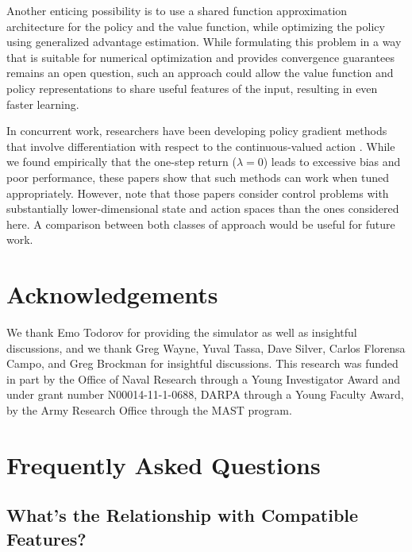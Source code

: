 \documentclass{article}
\begin{document}
Another enticing possibility is to use a shared function approximation architecture for the policy and the value function, while optimizing the policy using generalized advantage estimation.
While formulating this problem in a way that is suitable for numerical optimization and provides convergence guarantees remains an open question, such an approach could allow the value function and policy representations to share useful features of the input, resulting in even faster learning.

In concurrent work, researchers have been developing policy gradient methods that involve differentiation with respect to the continuous-valued action \citep{lillicrap2015continuous,heess2015learning}.
While we found empirically that the one-step return ($\lambda=0$) leads to excessive bias and poor performance, these papers show that such methods can work when tuned appropriately.
However, note that those papers consider control problems with substantially lower-dimensional state and action spaces than the ones considered here.
A comparison between both classes of approach would be useful for future work.





\section*{Acknowledgements}
We thank Emo Todorov for providing the simulator as well as insightful discussions, and we thank Greg Wayne, Yuval Tassa, Dave Silver, Carlos Florensa Campo, and Greg Brockman for insightful discussions.
This research was funded in part by the Office of Naval Research through a Young Investigator Award and under grant number N00014-11-1-0688,
DARPA through a Young Faculty Award, by the Army Research Office through the MAST program.

\appendix

\section{Frequently Asked Questions}

\newcommand{\gradthi}{\grad_{\theta_i}}
\newcommand{\gradthj}{\grad_{\theta_j}}


\subsection{What's the Relationship with Compatible Features?}\label{sec:cf}
\end{document}
